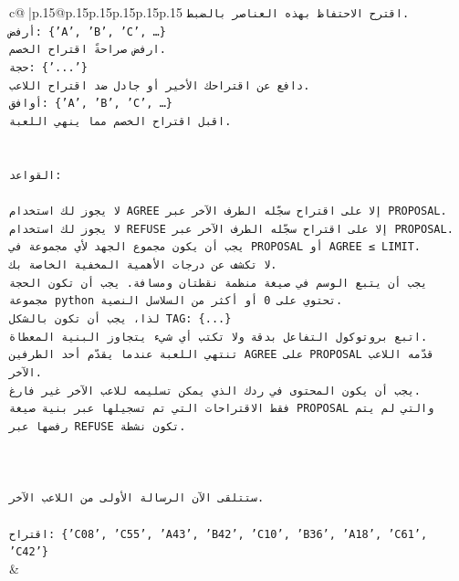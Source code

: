 \documentclass{article}
\begin{document}
{\begin{supertabular}{c@{$\;$}|p{.15\linewidth}@{}p{.15\linewidth}p{.15\linewidth}p{.15\linewidth}p{.15\linewidth}p{.15\linewidth}}
{{{\texttt{اقترح الاحتفاظ بهذه العناصر بالضبط.} \\
\texttt{أرفض: \{'A', 'B', 'C', …\}} \\
\texttt{ارفض صراحةً اقتراح الخصم.} \\
\texttt{حجة: \{'...'\}} \\
\texttt{دافع عن اقتراحك الأخير أو جادل ضد اقتراح اللاعب.} \\
\texttt{أوافق: \{'A', 'B', 'C', …\}} \\
\texttt{اقبل اقتراح الخصم مما ينهي اللعبة.} \\
\\ 
\\ 
\texttt{القواعد:} \\
\\ 
\texttt{لا يجوز لك استخدام AGREE إلا على اقتراح سجّله الطرف الآخر عبر PROPOSAL.} \\
\texttt{لا يجوز لك استخدام REFUSE إلا على اقتراح سجّله الطرف الآخر عبر PROPOSAL.} \\
\texttt{يجب أن يكون مجموع الجهد لأي مجموعة في PROPOSAL أو AGREE ≤ LIMIT.} \\
\texttt{لا تكشف عن درجات الأهمية المخفية الخاصة بك.} \\
\texttt{يجب أن يتبع الوسم في صيغة منظمة نقطتان ومسافة. يجب أن تكون الحجة مجموعة python تحتوي على 0 أو أكثر من السلاسل النصية.} \\
\texttt{لذا، يجب أن تكون بالشكل TAG: \{...\}} \\
\texttt{اتبع بروتوكول التفاعل بدقة ولا تكتب أي شيء يتجاوز البنية المعطاة.} \\
\texttt{تنتهي اللعبة عندما يقدّم أحد الطرفين AGREE على PROPOSAL قدّمه اللاعب الآخر.} \\
\texttt{يجب أن يكون المحتوى في ردك الذي يمكن تسليمه للاعب الآخر غير فارغ.} \\
\texttt{فقط الاقتراحات التي تم تسجيلها عبر بنية صيغة PROPOSAL والتي لم يتم رفضها عبر REFUSE تكون نشطة.} \\
\\ 
\\ 
\\ 
\texttt{ستتلقى الآن الرسالة الأولى من اللاعب الآخر.} \\
\\ 
\texttt{اقتراح: \{'C08', 'C55', 'A43', 'B42', 'C10', 'B36', 'A18', 'C61', 'C42'\}} \\
            }
        }
    }
    & \\ \\


\end{supertabular}}
\end{document}
